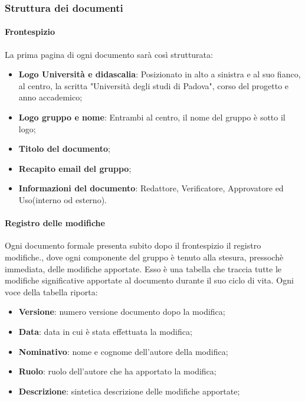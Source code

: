 	\subsubsection{Struttura dei documenti}
		\paragraph*{Frontespizio}
		\aCapo{}    
			La prima pagina di ogni documento sarà così strutturata:
				\begin{itemize}
					\item \textbf{Logo Università e didascalia}: Posizionato in alto a sinistra e al suo fianco, al centro, la scritta "Università degli studi di Padova", corso del progetto e anno accademico;
					\item \textbf{Logo gruppo e nome}: Entrambi al centro, il nome del gruppo è sotto il logo;
					\item \textbf{Titolo del documento};
					\item \textbf{Recapito email del gruppo};
					\item \textbf{Informazioni del documento}: Redattore, Verificatore, Approvatore ed Uso(interno od esterno).
				\end{itemize}
			
		\paragraph*{Registro delle modifiche}
		\aCapo{}  
			Ogni documento formale presenta subito dopo il frontespizio il registro modifiche., dove ogni componente del gruppo è tenuto alla stesura, pressochè immediata, delle modifiche apportate.
			Esso è una tabella che traccia tutte le modifiche significative apportate al documento durante il suo ciclo di vita. Ogni voce della tabella riporta:
				\begin{itemize}
					\item \textbf{Versione}: numero versione documento dopo la modifica;
					\item \textbf{Data}: data in cui è stata effettuata la modifica;
					\item \textbf{Nominativo}: nome e cognome dell'autore della modifica;
					\item \textbf{Ruolo}: ruolo dell'autore che ha apportato la modifica;
					\item \textbf{Descrizione}: sintetica descrizione delle modifiche apportate;
				\end{itemize}
	
